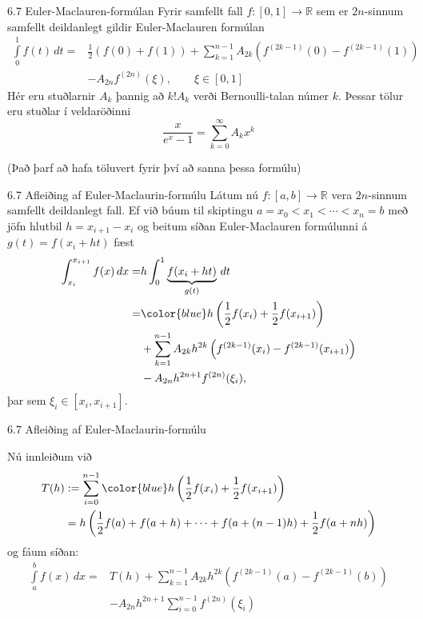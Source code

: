 \begin{frame}{6.7 Euler-Maclauren-formúlan} 
Fyrir samfellt fall $f : [0,1] \to \mathbb R$ sem er $2n$-sinnum
samfellt deildanlegt gildir Euler-Maclauren formúlan 
\begin{align*}
  \int\limits_0^1 f(t) \, dt 
  =&  \frac{1}{2}\left( f(0) + f(1) \right) 
  + \sum\limits_{k=1}^{n-1} A_{2k}
  \left( f^{(2k-1)}(0) - f^{(2k-1)}(1)\right) \\
  & - A_{2n}f^{(2n)}(\xi), \qquad \xi \in [0,1]
\end{align*}
\pause
Hér eru stuðlarnir $A_k$ þannig að $k!A_k$ verði Bernoulli-talan númer
$k$. Þessar tölur eru stuðlar í veldaröðinni 
\begin{equation*}
  \frac{x}{e^x -1} = \sum\limits_{k=0}^{\infty}A_kx^k
\end{equation*}

\pause
(Það þarf að hafa töluvert fyrir því að sanna þessa formúlu)
\end{frame}


\begin{frame}{6.7 Afleiðing af Euler-Maclaurin-formúlu}
Látum nú $f : [a,b] \to \mathbb R$ vera $2n$-sinnum samfellt
deildanlegt fall. \pause
Ef við búum til skiptingu $a= x_0 < x_1 < \cdots <
x_n = b$ með jöfn hlutbil $h = x_{i+1} - x_i$ og beitum síðan
Euler-Maclauren formúlunni á $g(t) = f(x_i + ht)$ fæst 
\begin{align*}
   \int_{x_i}^{x_{i+1}} f(x)\,dx 
  = & h\int_0^1 \underbrace{f(x_i + ht)}_{g(t)}\,dt \\
  = & {\color{blue} h \left( \frac{1}{2}f(x_i) + \frac{1}{2}f(x_{i+1})\right) }\\
   & +    \sum_{k=1}^{n-1}A_{2k}h^{2k}\left( f^{(2k-1)}(x_i) -
    f^{(2k-1)}(x_{i+1}) \right) \\
    & - A_{2n}h^{2n+1}f^{(2n)}(\xi_i), 
\end{align*}
þar sem $\xi_i \in [x_i, x_{i+1}]$.
\end{frame}

\begin{frame}{6.7 Afleiðing af Euler-Maclaurin-formúlu}

Nú innleiðum við
\begin{align*}
  T(h) 
  &:= \sum_{i=0}^{n-1}
  {\color{blue} h \left( \frac{1}{2} f(x_i) + 
  \frac{1}{2}f(x_{i+1}) \right)}\\
  &= h\left( \frac{1}{2}f(a) + f(a+h) 
    + \cdots + f(a+(n-1)h) + \frac{1}{2}f(a+nh)\right)
\end{align*}
\pause
og fáum síðan:
\begin{align*}
  \int\limits_a^b f(x)\, dx 
  = & T(h) + \sum_{k=1}^{n-1}A_{2k}h^{2k} 
  \left( f^{(2k-1)}(a) - f^{(2k-1)}(b) \right) \\
  & - A_{2n}h^{2n+1} \sum_{i=0}^{n-1} f^{(2n)}(\xi_i)
\end{align*}
\end{frame}


